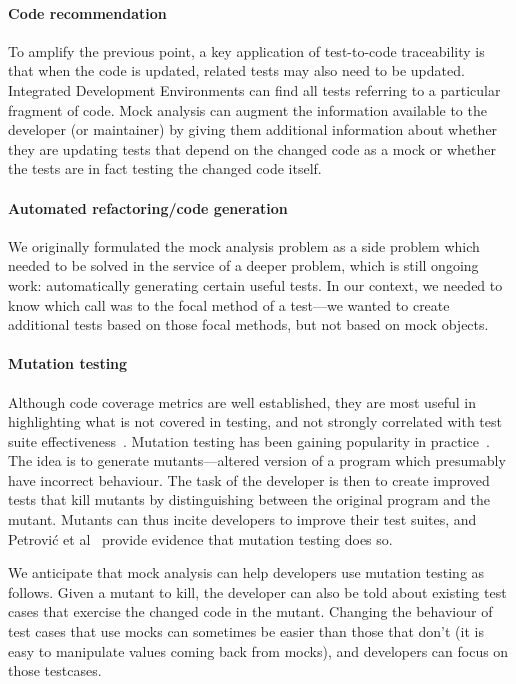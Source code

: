 \paragraph{Code recommendation}
To amplify the previous point, a key application of test-to-code
traceability is that when the code is updated, related tests may also
need to be updated. Integrated Development Environments can find
all tests referring to a particular fragment of code. Mock analysis
can augment the information available to the developer (or maintainer) by
giving them additional information about whether they are updating
tests that depend on the changed code as a mock or whether the tests
are in fact testing the changed code itself.

\paragraph{Automated refactoring/code generation}
We originally formulated the mock analysis problem as a side problem which needed
to be solved in the service of a deeper problem, which is still
ongoing work: automatically generating certain useful tests. In our context,
we needed to know which call was to the focal method of a test---we
wanted to create additional tests based on those focal methods, but
not based on mock objects.

\paragraph{Mutation testing}
Although code coverage metrics are well established, they are most useful in highlighting what is not covered in testing, and not strongly correlated with test suite effectiveness~\cite{inozemtseva14:_cover_not_stron_correl_test_suite_effec}. Mutation testing has been gaining popularity in practice~\cite{petrovic55:_pract_mutat_testin_scale,beller2021use}. The idea is to generate mutants---altered version of a program which presumably have incorrect behaviour. The task of the developer is then to create improved tests that kill mutants by distinguishing between the original program and the mutant. Mutants can thus incite developers to improve their test suites, and Petrovi\'c et al~\cite{Petrovic:mutation_testing} provide evidence that mutation testing does so.

We anticipate that mock analysis can help developers use mutation testing as follows. Given a mutant to kill, the developer can also be told about existing test cases that exercise the changed code in the mutant. Changing the behaviour of test cases that use mocks can sometimes be easier than those that don't (it is easy to manipulate values coming back from mocks), and developers can focus on those testcases.


